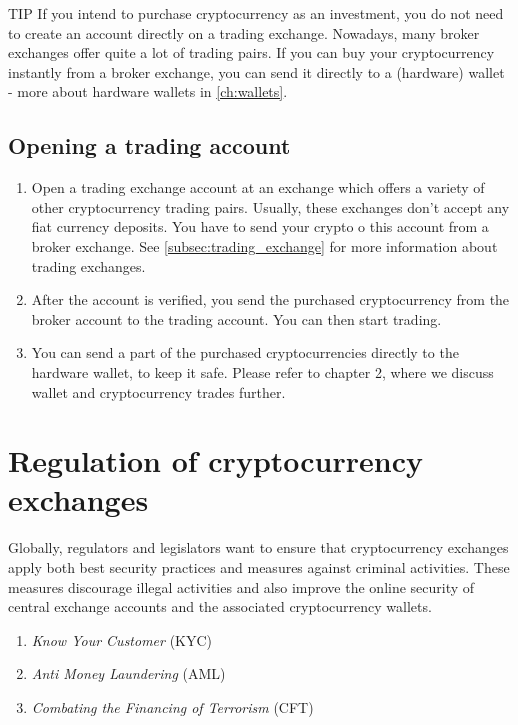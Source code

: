     \begin{tipbox}{TIP}
              If you intend to purchase cryptocurrency as an investment, you do not need to create an account directly on a trading exchange. Nowadays, many broker exchanges offer quite a lot of trading pairs. If you can buy your cryptocurrency instantly from a broker exchange, you can send it directly to a (hardware) wallet - more about hardware wallets in \cref{ch:wallets}.
    \end{tipbox}
 
\subsection*{Opening a trading account}
 \begin{enumerate}[resume]
    \item Open a trading exchange account at an exchange which offers a variety of other cryptocurrency trading pairs. Usually, these exchanges don't accept any fiat currency deposits. You have to send your crypto o this account from a broker exchange. See \cref{subsec:trading_exchange} for more information about trading exchanges.
    \item After the account is verified, you send the purchased cryptocurrency from the broker account to the trading account. You can then start trading.
    \item You can send a part of the purchased cryptocurrencies directly to the hardware wallet, to keep it safe. Please refer to chapter 2, where we discuss wallet and cryptocurrency trades further. 
\end{enumerate}


\section{Regulation of cryptocurrency exchanges}
Globally, regulators and legislators want to ensure that cryptocurrency exchanges apply both best security practices and measures against criminal activities. These measures discourage illegal activities and also improve the online security of central exchange accounts and the associated cryptocurrency wallets.

\begin{enumerate}
    \item \emph{Know Your Customer} (KYC)
    \item \emph{Anti Money Laundering} (AML)
    \item \emph{Combating the Financing of Terrorism} (CFT)
\end{enumerate} 

